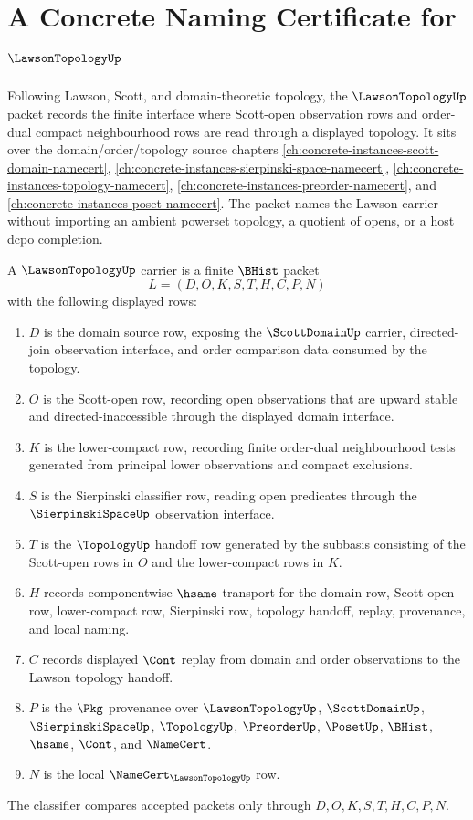 \chapter{A Concrete Naming Certificate for $\LawsonTopologyUp$}
\label{ch:concrete-instances-lawson-topology-namecert}

Following Lawson, Scott, and domain-theoretic topology, the $\LawsonTopologyUp$ packet records the finite interface where Scott-open observation rows and order-dual compact neighbourhood rows are read through a displayed topology. It sits over the domain/order/topology source chapters \autoref{ch:concrete-instances-scott-domain-namecert}, \autoref{ch:concrete-instances-sierpinski-space-namecert}, \autoref{ch:concrete-instances-topology-namecert}, \autoref{ch:concrete-instances-preorder-namecert}, and \autoref{ch:concrete-instances-poset-namecert}. The packet names the Lawson carrier without importing an ambient powerset topology, a quotient of opens, or a host dcpo completion.

\begin{definition}
\label{def:lawson-topology-carrier}
A $\LawsonTopologyUp$ carrier is a finite $\BHist$ packet
$$
L=(D,O,K,S,T,H,C,P,N)
$$
with the following displayed rows:
\begin{enumerate}
\item $D$ is the domain source row, exposing the $\ScottDomainUp$ carrier, directed-join observation interface, and order comparison data consumed by the topology.
\item $O$ is the Scott-open row, recording open observations that are upward stable and directed-inaccessible through the displayed domain interface.
\item $K$ is the lower-compact row, recording finite order-dual neighbourhood tests generated from principal lower observations and compact exclusions.
\item $S$ is the Sierpinski classifier row, reading open predicates through the $\SierpinskiSpaceUp$ observation interface.
\item $T$ is the $\TopologyUp$ handoff row generated by the subbasis consisting of the Scott-open rows in $O$ and the lower-compact rows in $K$.
\item $H$ records componentwise $\hsame$ transport for the domain row, Scott-open row, lower-compact row, Sierpinski row, topology handoff, replay, provenance, and local naming.
\item $C$ records displayed $\Cont$ replay from domain and order observations to the Lawson topology handoff.
\item $P$ is the $\Pkg$ provenance over $\LawsonTopologyUp$, $\ScottDomainUp$, $\SierpinskiSpaceUp$, $\TopologyUp$, $\PreorderUp$, $\PosetUp$, $\BHist$, $\hsame$, $\Cont$, and $\NameCert$.
\item $N$ is the local $\NameCert_{\LawsonTopologyUp}$ row.
\end{enumerate}
The classifier compares accepted packets only through $D,O,K,S,T,H,C,P,N$.
\end{definition}

